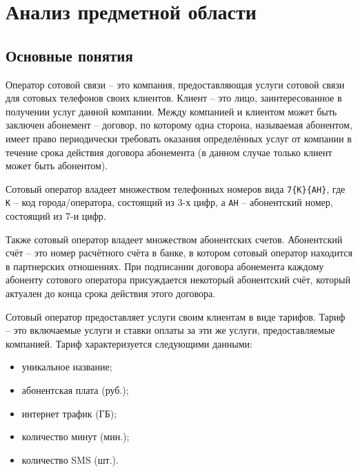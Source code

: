 \section{Анализ предметной области}\label{sec:domain-analysis}




\subsection{Основные понятия}


Оператор сотовой связи -- это компания, предоставляющая услуги сотовой связи для сотовых телефонов своих клиентов. Клиент -- это лицо, заинтересованное в получении услуг данной компании. Между компанией и клиентом может быть заключен абонемент -- договор, по которому одна сторона, называемая абонентом, имеет право периодически требовать оказания определённых услуг от компании в течение срока действия договора абонемента (в данном случае только клиент может быть абонентом).

Сотовый оператор владеет множеством телефонных номеров вида \texttt{7\{К\}\{АН\}}, где \texttt{К} -- код города/оператора, состоящий из 3-х цифр, а \texttt{АН} -- абонентский номер, состоящий из 7-и цифр. %

Также сотовый оператор владеет множеством абонентских счетов. Абонентский счёт -- это номер расчётного счёта в банке, в котором сотовый оператор находится в партнерских отношениях. При подписании договора абонемента каждому абоненту сотового оператора присуждается некоторый абонентский счёт, который актуален до конца срока действия этого договора.

Сотовый оператор предоставляет услуги своим клиентам в виде тарифов. Тариф -- это включаемые услуги и ставки оплаты за эти же услуги, предоставляемые компанией. Тариф характеризуется следующими данными:
\begin{itemize}
    \item уникальное название;
    \item абонентская плата (руб.);
    \item интернет трафик (ГБ);
    \item количество минут (мин.);
    \item количество SMS (шт.).
\end{itemize}

